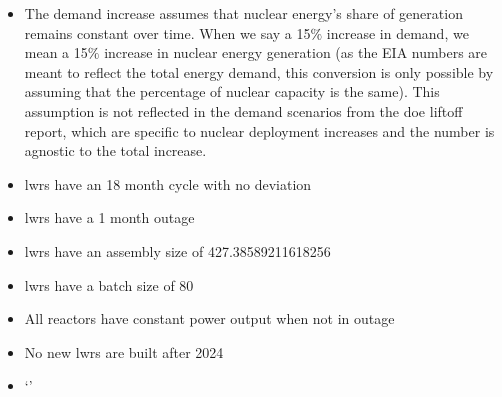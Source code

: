 \begin{itemize}
    \item The demand increase assumes that nuclear energy's share of generation remains constant over time. When we say a 15$\%$ increase in demand, we mean a 15$\%$ increase in nuclear energy generation (as the EIA numbers are meant to reflect the total energy demand, this conversion is only possible by assuming that the percentage of nuclear capacity is the same). This assumption is not reflected in the demand scenarios from the \gls{doe} liftoff report, which are specific to nuclear deployment increases and the number is agnostic to the total increase.
    \item \gls{lwr}s have an 18 month cycle with no deviation
    \item \gls{lwr}s have a 1 month outage
    \item \gls{lwr}s have an assembly size of 427.38589211618256
    \item \gls{lwr}s have a batch size of 80
    \item All reactors have constant power output when not in outage
    \item No new \gls{lwr}s are built after 2024
    \item`'
\end{itemize}